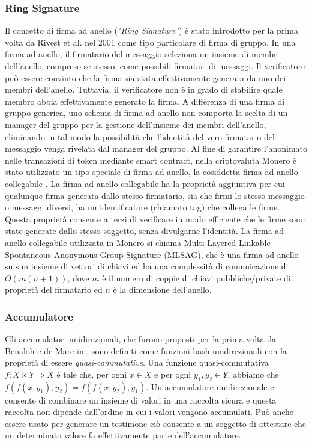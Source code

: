 \subsubsection{Ring Signature}
Il concetto di firma ad anello (\emph{"Ring Signature"}) è stato introdotto per la prima volta da Rivest et al. \cite{c27} nel 2001 come tipo particolare di firma di gruppo. In una firma ad anello, il firmatario del messaggio seleziona un insieme di membri dell'anello, compreso se stesso, come possibili firmatari di messaggi. Il verificatore può essere convinto che la firma sia stata effettivamente generata da uno dei membri dell'anello.
Tuttavia, il verificatore non è in grado di stabilire quale membro abbia effettivamente generato la firma. A differenza di una firma di gruppo generica, uno schema di firma ad anello non comporta la scelta di un manager del gruppo per la gestione dell'insieme dei membri dell'anello, eliminando in tal modo la possibilità che l'identità del vero firmatario del messaggio venga rivelata dal manager del gruppo. Al fine di garantire l'anonimato nelle transazioni di token mediante smart contract, nella criptovaluta Monero è stato utilizzato un tipo speciale di firma ad anello, la cosiddetta firma ad anello collegabile \cite{c20}. La firma ad anello collegabile ha la proprietà aggiuntiva per cui qualunque firma generata dallo stesso firmatario, sia che firmi lo stesso messaggio o messaggi diversi, ha un identificatore (chiamato tag) che collega le firme. Questa proprietà consente a terzi di verificare in modo efficiente che le firme sono state generate dallo stesso soggetto, senza divulgarne l'identità. La firma ad anello collegabile utilizzata in Monero si chiama   Multi-Layered Linkable Spontaneous Anonymous Group Signature (MLSAG)\cite{c22}, che è una firma ad anello su sun insieme di vettori di chiavi ed ha una complessità di comunicazione di $O(m(n + 1))$, dove $m$ è il numero di coppie di chiavi pubbliche/private di proprietà del firmatario ed $n$ è la dimensione dell'anello.

\subsubsection{Accumulatore}
Gli accumulatori unidirezionali, che furono proposti per la prima volta da Benaloh e de Mare in \cite{c2}, sono definiti come funzioni hash unidirezionali con la proprietà di essere \emph{quasi-commutative}. Una funzione quasi-commutativa $f: X \times Y \Rightarrow X$ è tale che, per ogni $x \in X$ e per ogni $y_1, y_2 \in Y$, abbiamo che $f(f(x, y_1), y_2) = f(f(x, y_2), y_1)$. Un accumulatore unidirezionale ci consente di
combinare un insieme di valori in una raccolta sicura e questa raccolta non dipende dall'ordine in cui i valori vengono accumulati. Può anche essere usato per generare un testimone ciò consente a un soggetto di attestare che un determinato valore fa effettivamente parte dell'accumulatore.

